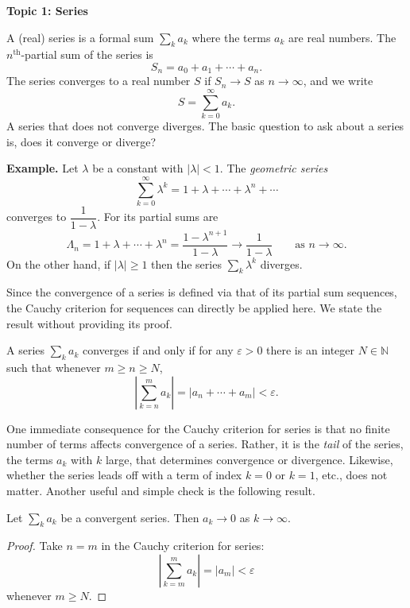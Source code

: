 \documentclass[11pt]{article}
\begin{document}
\begin{center}
  \textbf{Topic 1: Series}
\end{center}

A (real) \textsf{series} is a formal sum $\sum_k a_k$ where the terms $a_k$ are real numbers.
The \textsf{$n^{\text{th}}$-partial sum} of the series is
\[
  S_n = a_0 + a_1 + \cdots + a_n.
\]
The series \textsf{converges} to a real number $S$ if $S_n \to S$ as $n \to \infty$, and we write
\[
  S = \sum_{k=0}^\infty a_k.
\]
A series that does not converge \textsf{diverges}.
The basic question to ask about a series is, does it converge or diverge?

\medskip
\noindent\textbf{Example.} Let $\lambda$ be a constant with $|\lambda| < 1$.
The \textit{geometric series} 
\[
  \sum_{k=0}^\infty \lambda^k = 1 + \lambda + \cdots + \lambda^n + \cdots
\]
converges to $\dfrac{1}{1-\lambda}$.
For its partial sums are
\[
  \Lambda_n = 1 + \lambda + \cdots + \lambda^n = \frac{1 - \lambda^{n+1}}{1 - \lambda} \to \frac{1}{1 - \lambda} \qquad \text{as $n \to \infty$}.
\]
On the other hand, if $|\lambda|\geqslant1$ then the series $\sum_k \lambda^k$ diverges.

\medskip
Since the convergence of a series is defined via that of its partial sum sequences, the Cauchy criterion for sequences can directly be applied here.
We state the result without providing its proof.

\begin{prop}
  A series $\sum_k a_k$ converges if and only if for any $\varepsilon > 0$ there is an integer $N \in \mathbb{N}$ such that whenever $m \geqslant n \geqslant N$,
  \[
    \left| \sum_{k=n}^m a_k \right| = |a_n + \cdots + a_m| < \varepsilon.
  \]
\end{prop}

One immediate consequence for the Cauchy criterion for series is that no finite number of terms affects convergence of a series.
Rather, it is the \textit{tail} of the series, the terms $a_k$ with $k$ large, that determines convergence or divergence.
Likewise, whether the series leads off with a term of index $k = 0$ or $k = 1$, etc., does not matter.
Another useful and simple check is the following result.

\begin{cor}
  \label{cor:zero-test}
  Let $\sum_k a_k$ be a convergent series.
  Then $a_k \to 0$ as $k \to \infty$.
\end{cor}

\begin{proof}
  Take $n = m$ in the Cauchy criterion for series:
  \[
    \left| \sum_{k=m}^m a_k \right| = |a_m| < \varepsilon
  \]
  whenever $m \geqslant N$.
\end{proof}
\end{document}

